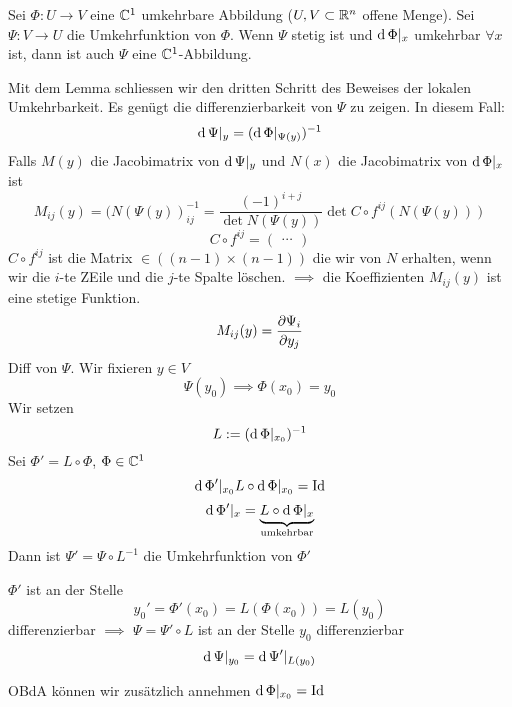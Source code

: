 \begin{Lem}
  Sei $\Phi:U\to V$ eine $\mathbb{C}^1$ umkehrbare Abbildung ($U,V\subset\mathbb{R}^n$ offene Menge). Sei $\Psi:V\to U$ die Umkehrfunktion von $\Phi$. Wenn $\Psi$ stetig ist und $\operatorname{d} \Phi|_x$ umkehrbar $\forall x$ ist, dann ist auch $\Psi$ eine $\mathbb{C}^1$-Abbildung.
\end{Lem}
Mit dem Lemma schliessen wir den dritten Schritt des Beweises der lokalen Umkehrbarkeit.
  Es genügt die differenzierbarkeit von $\Psi$ zu zeigen. In diesem Fall:
  \[\operatorname{d}\Psi|_y= (\operatorname{d}\Phi|_{\Psi(y)})^{-1}\]
  Falls $M(y)$ die Jacobimatrix von $\operatorname{d}\Psi|_y$ und $N(x)$ die Jacobimatrix von $\operatorname{d}\Phi|_x$ ist
  \[M_{ij}(y)=(N(\Psi(y))^{-1}_{ij}=\frac{(-1)^{i+j}}{\det N(\Psi(y))}\det C\circ f^{ij}(N(\Psi(y)))\]
  \[C\circ f^{ij}= \begin{pmatrix} \cdots \end{pmatrix}\]
  $C\circ f^{ij}$ ist die Matrix $\in ( (n-1)\times (n-1))$ die wir von $N$ erhalten, wenn wir die $i$-te ZEile und die $j$-te Spalte löschen. $\implies$ die Koeffizienten $M_{ij}(y)$ ist eine stetige Funktion.
  \[M_{ij}(y)=\dfrac{\partial \Psi_i}{\partial y_j}\]
  Diff von $\Psi$. Wir fixieren $y\in V$
  \[\Psi(y_0)\implies\Phi(x_0)=y_0\]
  Wir setzen
  \[L:=(\operatorname{d}\Phi|_{x_0})^{-1}\]
  Sei $\Phi'=L\circ\Phi$, $\Phi\in\mathbb{C}^1$
  \[\operatorname{d}\Phi'|_{x_0}L\circ\operatorname{d}\Phi|_{x_0}=\operatorname{Id}\]
  \[\operatorname{d}\Phi'|_x=\underbrace{L\circ\operatorname{d}\Phi|_x}_{\text{umkehrbar}}\]
  Dann ist $\Psi'=\Psi\circ L^{-1}$ die Umkehrfunktion von $\Phi'$
\begin{Beh}
  $\Phi'$ ist an der Stelle 
  \[y_0'=\Phi'(x_0)=L(\Phi(x_0))=L(y_0)\]
  differenzierbar $\implies$ $\Psi=\Psi'\circ L$ ist an der Stelle $y_0$ differenzierbar
  \[\operatorname{d}\Psi|_{y_0}=\operatorname{d}\Psi'|_{L(y_0)}\]
\end{Beh}
OBdA können wir zusätzlich annehmen $\operatorname{d}\Phi|_{x_0}=\operatorname{Id}$
